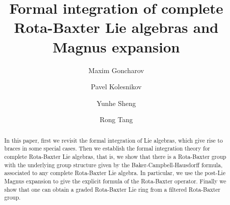 \documentclass[12pt]{amsart}
\theoremstyle{definition}   %
\begin{document}
\title{
    Formal integration of complete Rota-Baxter  Lie algebras and Magnus expansion
}



\author{Maxim Goncharov}
\address{Sobolev Institute of Mathematics, Acad. Koptyug ave. 4, Novosibirsk, Russia}

\author{Pavel Kolesnikov}
\address{Sobolev Institute of Mathematics, Acad. Koptyug ave. 4, Novosibirsk, Russia}

\author{Yunhe Sheng}
\address{Department of Mathematics, Jilin University, Changchun 130012, Jilin, China}

\author{Rong Tang}
\address{Department of Mathematics, Jilin University, Changchun 130012, Jilin, China}


\begin{abstract}
In this paper, first we revisit the  formal integration of   Lie algebras, which give rise to braces in some special cases. Then we establish  the formal integration theory for complete Rota-Baxter Lie algebras, that is, we show that there is a Rota-Baxter group with the underlying group structure given by the Baker-Campbell-Hausdorff  formula, associated to any complete Rota-Baxter Lie algebra. In particular, we use the post-Lie Magnus expansion to give the explicit formula of the Rota-Baxter operator. Finally we show that one can obtain a graded Rota-Baxter Lie ring from a filtered Rota-Baxter group.

\end{abstract}




\renewcommand{\thefootnote}{}
\end{document}
